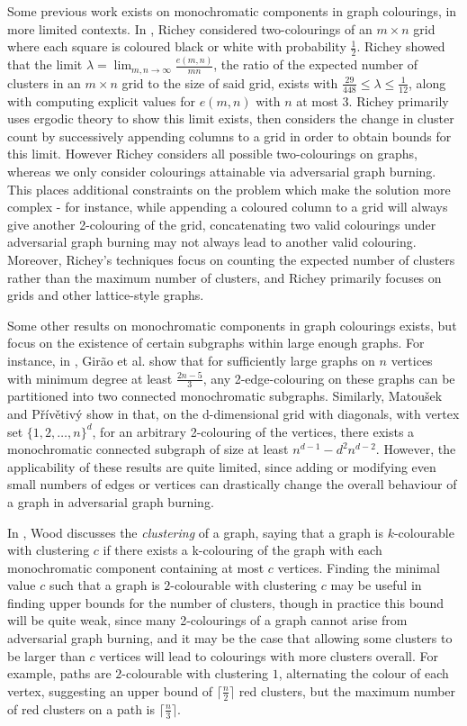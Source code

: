 \documentclass{mprop}
\begin{document}
Some previous work exists on monochromatic components in graph colourings, in more limited contexts. In \cite{richey_counting_nodate}, Richey considered two-colourings of an $m \times n$ grid where each square is coloured black or white with probability $\frac{1}{2}$. Richey showed that the limit $\lambda = \lim_{m, n \rightarrow \infty} \frac{e(m, n)}{mn}$, the ratio of the expected number of clusters in an $m \times n$ grid to the size of said grid, exists with $\frac{29}{448} \leq \lambda \leq \frac{1}{12}$, along with computing explicit values for $e(m,n)$ with $n$ at most 3. Richey primarily uses ergodic theory to show this limit exists, then considers the change in cluster count by successively appending columns to a grid in order to obtain bounds for this limit. However Richey considers all possible two-colourings on graphs, whereas we only consider colourings attainable via adversarial graph burning. This places additional constraints on the problem which make the solution more complex - for instance, while appending a coloured column to a grid will always give another 2-colouring of the grid, concatenating two valid colourings under adversarial graph burning may not always lead to another valid colouring. Moreover, Richey's techniques focus on counting the expected number of clusters rather than the maximum number of clusters, and Richey primarily focuses on grids and other lattice-style graphs.

Some other results on monochromatic components in graph colourings exists, but focus on the existence of certain subgraphs within large enough graphs. For instance, in \cite{girao_partitioning_2019}, Gir\~ao et al. show that for sufficiently large graphs on $n$ vertices with minimum degree at least $\frac{2n-5}{3}$, any 2-edge-colouring on these graphs can be partitioned into two connected monochromatic subgraphs. Similarly, Matou\v sek and P\v r\'iv\v etiv\'y show in \cite{matousek_large_2007} that, on the d-dimensional grid with diagonals, with vertex set $\{1,2,\dots,n\}^d$, for an arbitrary 2-colouring of the vertices, there exists a monochromatic connected subgraph of size at least $n^{d-1}-d^2n^{d-2}$. However, the applicability of these results are quite limited, since adding or modifying even small numbers of edges or vertices can drastically change the overall behaviour of a graph in adversarial graph burning. 

In \cite{wood_defective_2018}, Wood discusses the \emph{clustering} of a graph, saying that a graph is $k$-colourable with clustering $c$ if there exists a k-colouring of the graph with each monochromatic component containing at most $c$ vertices. Finding the minimal value $c$ such that a graph is $2$-colourable with clustering $c$ may be useful in finding upper bounds for the number of clusters, though in practice this bound will be quite weak, since many 2-colourings of a graph cannot arise from adversarial graph burning, and it may be the case that allowing some clusters to be larger than $c$ vertices will lead to colourings with more clusters overall. For example, paths are $2$-colourable with clustering $1$, alternating the colour of each vertex, suggesting an upper bound of $\lceil \frac{n}{2} \rceil$ red clusters, but the maximum number of red clusters on a path is $\lceil \frac{n}{3} \rceil$.
\end{document}

